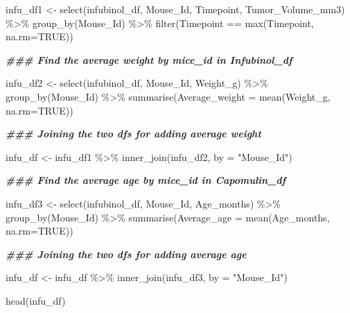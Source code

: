 \documentclass[
]{article}
\newenvironment{Shaded}{\begin{snugshade}}{\end{snugshade}}
\newcommand{\AttributeTok}[1]{\textcolor[rgb]{0.77,0.63,0.00}{#1}}
\newcommand{\ConstantTok}[1]{\textcolor[rgb]{0.00,0.00,0.00}{#1}}
\newcommand{\DocumentationTok}[1]{\textcolor[rgb]{0.56,0.35,0.01}{\textbf{\textit{#1}}}}
\newcommand{\FunctionTok}[1]{\textcolor[rgb]{0.00,0.00,0.00}{#1}}
\newcommand{\NormalTok}[1]{#1}
\newcommand{\OtherTok}[1]{\textcolor[rgb]{0.56,0.35,0.01}{#1}}
\newcommand{\SpecialCharTok}[1]{\textcolor[rgb]{0.00,0.00,0.00}{#1}}
\newcommand{\StringTok}[1]{\textcolor[rgb]{0.31,0.60,0.02}{#1}}
\begin{document}
\begin{Shaded}
\begin{Highlighting}[]
\NormalTok{infu\_df1 }\OtherTok{\textless{}{-}} \FunctionTok{select}\NormalTok{(infubinol\_df, Mouse\_Id, Timepoint, Tumor\_Volume\_mm3) }\SpecialCharTok{\%\textgreater{}\%}
  \FunctionTok{group\_by}\NormalTok{(Mouse\_Id) }\SpecialCharTok{\%\textgreater{}\%}
  \FunctionTok{filter}\NormalTok{(Timepoint }\SpecialCharTok{==} \FunctionTok{max}\NormalTok{(Timepoint, }\AttributeTok{na.rm=}\ConstantTok{TRUE}\NormalTok{))}

\DocumentationTok{\#\#\# Find the average weight by mice\_id in Infubinol\_df}


\NormalTok{infu\_df2 }\OtherTok{\textless{}{-}} \FunctionTok{select}\NormalTok{(infubinol\_df, Mouse\_Id, Weight\_g) }\SpecialCharTok{\%\textgreater{}\%}
  \FunctionTok{group\_by}\NormalTok{(Mouse\_Id) }\SpecialCharTok{\%\textgreater{}\%}
 \FunctionTok{summarise}\NormalTok{(}\AttributeTok{Average\_weight =} \FunctionTok{mean}\NormalTok{(Weight\_g, }\AttributeTok{na.rm=}\ConstantTok{TRUE}\NormalTok{))}

\DocumentationTok{\#\#\# Joining the two df\textquotesingle{}s for adding average weight}

\NormalTok{infu\_df }\OtherTok{\textless{}{-}}\NormalTok{ infu\_df1 }\SpecialCharTok{\%\textgreater{}\%} \FunctionTok{inner\_join}\NormalTok{(infu\_df2, }\AttributeTok{by =} \StringTok{"Mouse\_Id"}\NormalTok{)}

\DocumentationTok{\#\#\# Find the average age by mice\_id in Capomulin\_df}

\NormalTok{infu\_df3 }\OtherTok{\textless{}{-}} \FunctionTok{select}\NormalTok{(infubinol\_df, Mouse\_Id, Age\_months) }\SpecialCharTok{\%\textgreater{}\%}
  \FunctionTok{group\_by}\NormalTok{(Mouse\_Id) }\SpecialCharTok{\%\textgreater{}\%}
 \FunctionTok{summarise}\NormalTok{(}\AttributeTok{Average\_age =} \FunctionTok{mean}\NormalTok{(Age\_months, }\AttributeTok{na.rm=}\ConstantTok{TRUE}\NormalTok{))}

\DocumentationTok{\#\#\# Joining the two df\textquotesingle{}s for adding average age}

\NormalTok{infu\_df }\OtherTok{\textless{}{-}}\NormalTok{ infu\_df }\SpecialCharTok{\%\textgreater{}\%} \FunctionTok{inner\_join}\NormalTok{(infu\_df3, }\AttributeTok{by =} \StringTok{"Mouse\_Id"}\NormalTok{)}

\FunctionTok{head}\NormalTok{(infu\_df)}
\end{Highlighting}
\end{Shaded}
\end{document}
